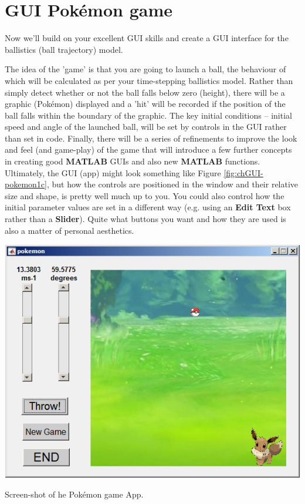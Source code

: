 \documentclass{tufte-book} %
\begin{document}

\newpage


\section{GUI Pok\'emon game}

Now we'll build on your excellent GUI skills and create a GUI interface for the ballistics (ball trajectory) model.

The idea of the 'game' is that you are going to launch a ball, the behaviour of which will be calculated as per your time-stepping ballistics model. Rather than simply detect whether or not the ball falls below zero (height), there will be a graphic (Pok\'emon) displayed and a 'hit' will be recorded if the position of the ball falls within the boundary of the graphic. The key initial conditions -- initial speed and angle of the launched ball, will be set by controls in the GUI rather than set in code. Finally, there will be a series of refinements to improve the look and feel (and game-play) of the game that will introduce a few further concepts in creating good \textbf{MATLAB} GUIs and also new \textbf{MATLAB} functions. 
Ultimately, the GUI (app) might look something like Figure \ref{fig:chGUI-pokemon1c}, but how the controls are positioned in the window and their relative size and shape, is pretty well much up to you. You could also control how the initial parameter values are set in a different way (e.g. using an \textbf{Edit Text} box rather than a \textbf{Slider}). Quite what buttons you want and how they are used is also a matter of personal aesthetics. 

\begin{marginfigure}[-5.25in]
\includegraphics[width=\linewidth]{chGUI-pokemon1c.png}
\caption{Screen-shot of he Pok\'emon game App.}
\label{fig:chGUI-pokemon1c}
\end{marginfigure}
\end{document}
